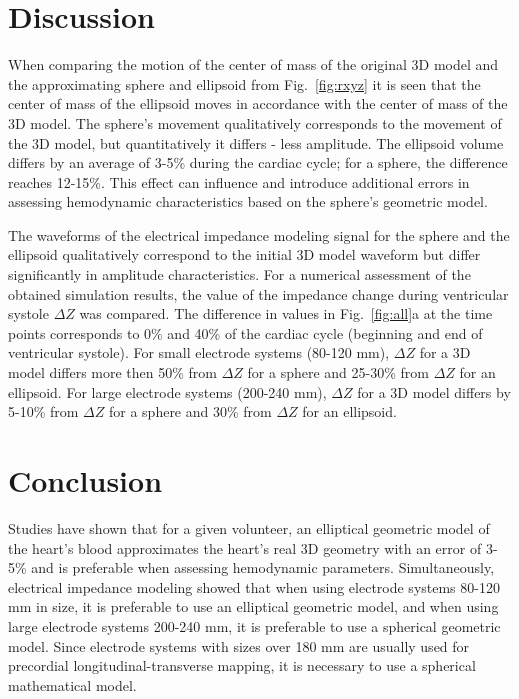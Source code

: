 \documentclass[conference]{IEEEtran}
\begin{document}
\section{Discussion}

When comparing the motion of the center of mass of the original 3D model and the
approximating sphere and ellipsoid from Fig.~\ref{fig:rxyz} it is seen that the
center of mass of the ellipsoid moves in accordance with the center of mass of
the 3D model. The sphere's movement qualitatively corresponds to the movement of
the 3D model, but quantitatively it differs - less amplitude. The ellipsoid
volume differs by an average of 3-5\% during the cardiac cycle; for a sphere,
the difference reaches 12-15\%. This effect can influence and introduce
additional errors in assessing hemodynamic characteristics based on the sphere's
geometric model.

The waveforms of the electrical impedance modeling signal for the sphere and the
ellipsoid qualitatively correspond to the initial 3D model waveform but differ
significantly in amplitude characteristics. For a numerical assessment of the
obtained simulation results, the value of the impedance change during
ventricular systole $ \Delta Z $ was compared. The difference in values in
Fig.~\ref{fig:all}a at the time points corresponds to 0\% and 40\% of the cardiac
cycle (beginning and end of ventricular systole). For small electrode systems
(80-120 mm), $\Delta Z$ for a 3D model differs more then 50\% from $\Delta Z $ for a
sphere and 25-30\% from $\Delta Z$ for an ellipsoid.
For large electrode systems
(200-240 mm), $\Delta Z$ for a 3D model differs by 5-10\% from $\Delta Z$ for a
sphere and 30\% from $\Delta Z $ for an ellipsoid.%

\section{Conclusion}

Studies have shown that for a given volunteer, an elliptical geometric model of
the heart's blood approximates the heart's real 3D geometry with an error of
3-5\% and is preferable when assessing hemodynamic parameters. Simultaneously,
electrical impedance modeling showed that when using electrode systems 80-120 mm
in size, it is preferable to use an elliptical geometric model, and when using
large electrode systems 200-240 mm, it is preferable to use a spherical
geometric model. Since electrode systems with sizes over 180 mm are usually used
for precordial longitudinal-transverse mapping, it is necessary to use a
spherical mathematical model.
\end{document}
